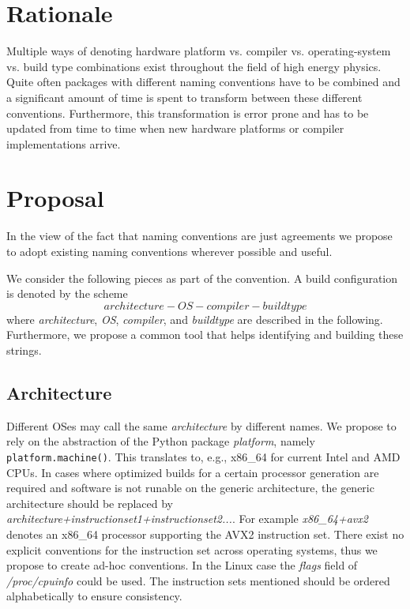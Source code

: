 \documentclass[12pt,a4paper]{article}
\begin{document}
\pagestyle{plain} %
\setcounter{page}{1}

\section{Rationale}

Multiple ways of denoting hardware platform vs. compiler vs. operating-system vs. build type combinations exist throughout the field of high energy physics. Quite often packages with different naming conventions have to be combined and a significant amount of time is spent to transform between these different conventions. Furthermore, this transformation is error prone and has to be updated from time to time when new hardware platforms or compiler implementations arrive.

\section{Proposal}

In the view of the fact that naming conventions are just agreements we propose to adopt existing naming conventions wherever possible and useful.

We consider the following pieces as part of the convention. A build configuration is denoted by the scheme
\[architecture-OS-compiler-buildtype\]
where \emph{architecture}, \emph{OS}, \emph{compiler}, and \emph{buildtype} are described in the following. Furthermore, we propose a common tool that helps identifying and building these strings.

\subsection{Architecture}

Different OSes may call the same \emph{architecture} by different names. We propose to rely on the abstraction of the Python package \emph{platform}, namely \texttt{platform.machine()}. This translates to, e.g., x86\_64 for current Intel and AMD CPUs. In cases where optimized builds for a certain processor generation are required and software is not runable on the generic architecture, the generic architecture should be replaced by \emph{architecture+instructionset1+instructionset2...}. For example \emph{x86\_64+avx2} denotes an x86\_64 processor supporting the AVX2 instruction set.
There exist no explicit conventions for the instruction set across operating systems, thus we propose to create ad-hoc conventions. In the Linux case the \emph{flags} field of \emph{/proc/cpuinfo} could be used. The instruction sets mentioned should be ordered alphabetically to ensure consistency.
\end{document}
